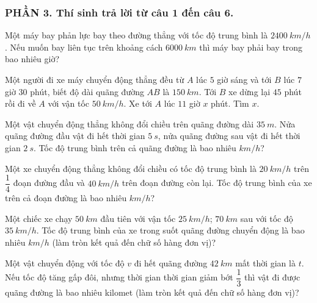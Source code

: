 \subsubsection*{PHẦN 3. Thí sinh trả lời từ câu 1 đến câu 6.}
\setcounter{ex}{0}
\begin{ex}%
Một máy bay phản lực bay theo đường thẳng với tốc độ trung bình là $2400\ km/h$. Nếu muốn bay liên tục trên khoảng cách $6000\ km$ thì máy bay phải bay trong bao nhiêu giờ?
\loigiai{
}
\end{ex}
\begin{ex}%
Một người đi xe máy chuyển động thẳng đều từ $A$ lúc $5$ giờ sáng và tới $B$ lúc $7$ giờ $30$ phút, biết độ dài quãng đường $AB$ là $150\ km$. Tới $B$ xe dừng lại $45$ phút rồi đi về $A$ với vận tốc $50\ km/h$. Xe tới $A$ lúc $11$ giờ $x$ phút. Tìm $x$.
\loigiai{
}
\end{ex}
\begin{ex}%
Một vật chuyển động thẳng không đổi chiều trên quãng đường dài $35\ m$. Nửa quãng đường đầu vật đi hết thời gian $5\ s$, nửa quãng đường sau vật đi hết thời gian $2\ s$. Tốc độ trung bình trên cả quãng đường là bao nhiêu $km/h$?
\loigiai{
}
\end{ex}
\begin{ex}%
Một xe chuyển động thẳng không đổi chiều có tốc độ trung bình là $20\ km/h$ trên $\dfrac{1}{4}$ đoạn đường đầu và $40\ km / h$ trên đoạn đường còn lại. Tốc độ trung bình của xe trên cả đoạn đường là bao nhiêu $km/h$?
\loigiai{
}
\end{ex}
\begin{ex}%
Một chiếc xe chạy $50\ km$ đầu tiên với vận tốc $25\ km/h$; $70\ km$ sau với tốc độ $35\ km/h$. Tốc độ trung bình của xe trong suốt quãng đường chuyển động là bao nhiêu $km/h$ (làm tròn kết quả đến chữ số hàng đơn vị)?
\loigiai{}
\end{ex}
\begin{ex}%
Một vật chuyển động với tốc độ $v$ đi hết quãng đường $42\ km$ mất thời gian là $t$. Nếu tốc độ tăng gấp đôi, nhưng thời gian thời gian giảm bớt $\dfrac{1}{3}$ thì vật đi được quãng đường là bao nhiêu kilomet (làm tròn kết quả đến chữ số hàng đơn vị)?
\loigiai{
}
\end{ex}






\newpage 



